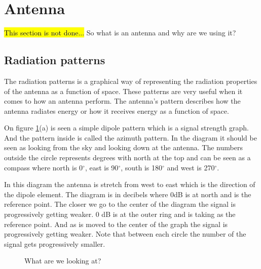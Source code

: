 \section{Antenna}\label{sec:antenna}
\hl{This section is not done...} So what is an antenna and why are we using it?

\subsection{Radiation patterns}
The radiation patterns is a graphical way of representing the radiation properties of the antenna as a function of space. These patterns are very useful when it comes to how an antenna perform. The antenna's pattern describes how the antenna radiates energy or how it receives energy as a function of space.

On figure \ref{fig:subfigure_RP_Dipole_Antenna}(a) is seen a simple dipole pattern which is a signal strength graph. And the pattern inside is called the azimuth pattern. In the diagram it should be seen as looking from the sky and looking down at the antenna. The numbers outside the circle represents degrees with north at the top and can be seen as a compass where north is 0$^{\circ}$, east is 90$^{\circ}$, south is 180$^{\circ}$ and west is 270$^{\circ}$. 

In this diagram the antenna is stretch from west to east which is the direction of the dipole element.  The diagram is in decibels where 0dB is at north and is the reference point. The closer we go to the center of the diagram the signal is progressively getting weaker. 0 dB is at the outer ring and is taking as the reference point. And as is moved to the center of the graph the signal is progressively getting weaker. Note that between each circle the number of the signal gets progressively smaller.

\begin{figure}[H]
\hfill
{}
\hfill
{}
\hfill
\caption{What are we looking at?}
\label{fig:subfigure_RP_Dipole_Antenna}
\end{figure}

